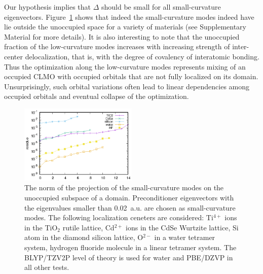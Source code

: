 \documentclass[aps,prl,twocolumn,reprint,amsmath,amssymb]{revtex4-1}
\begin{document}
Our hypothesis implies that $\Delta$ should be small for all small-curvature eigenvectors. 
Figure~\ref{fig:projection} shows that indeed the small-curvature modes indeed have lie outside the unoccupied space for a variety of materials (see Supplementary Material for more details). 
It is also interesting to note that the unoccupied fraction of the low-curvature modes increases with increasing strength of inter-center delocalization, that is, with the degree of covalency of interatomic bonding. %
Thus the optimization along the low-curvature modes represents mixing of an occupied CLMO with occupied orbitals that are not fully localized on its domain. 
Unsurprisingly, such orbital variations often lead to linear dependencies among occupied orbitals and eventual collapse of the optimization. 

\begin{figure}
\centering
\includegraphics[width=0.5\textwidth]{residue}
\caption{
The norm of the projection of the small-curvature modes on the unoccupied subspace of a domain. 
Preconditioner eigenvectors with the eigenvalues smaller than 0.02~a.u. are chosen as small-curvature modes. 
The following localization ceneters are considered: Ti$^{4+}$ ions in the TiO$_2$ rutile lattice, Cd$^{2+}$ ions in the CdSe Wurtzite lattice, Si atom in the diamond silicon lattice, O$^{2-}$ in a water tetramer system, hydrogen fluoride molecule in a linear tetramer system. 
The BLYP/TZV2P level of theory is used for water and PBE/DZVP in all other tests.}
\label{fig:projection}
\end{figure}
\end{document}
